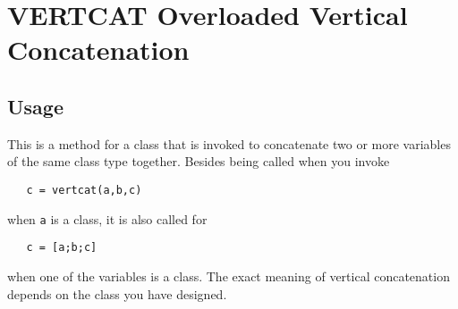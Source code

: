 \section{VERTCAT Overloaded Vertical Concatenation}

\subsection{Usage}

This is a method for a class that is invoked to concatenate two or more
variables of the same class type together.  Besides being called when
you invoke
\begin{verbatim}
   c = vertcat(a,b,c)
\end{verbatim}
when \verb|a| is a class, it is also called for
\begin{verbatim}
   c = [a;b;c]
\end{verbatim}
when one of the variables is a class.  The exact meaning of 
vertical concatenation depends on the class you have designed.
